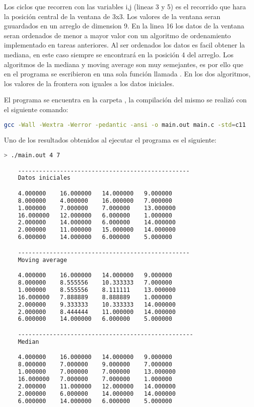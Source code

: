 Los ciclos que recorren con las variables i,j (lineas 3 y 5) es el recorrido que hara la posición central de la ventana de 3x3. Los valores de la ventana seran guuardados en un arreglo de dimension 9. En la linea 16 los datos de la ventana seran ordenados de menor a mayor valor con un algoritmo de ordenamiento implementado en tareas anteriores. Al ser ordenados los datos es facil obtener la mediana, en este caso siempre se encontrará en la posición 4 del arreglo. Los algoritmos de la mediana y moving average son muy semejantes, es por ello que en el programa  se escribieron en una sola función llamada . En los dos algoritmos, los valores de la frontera son iguales a los datos iniciales.

El programa se encuentra en la carpeta , la compilación del mismo se realizó con el siguiente comando:

\begin{lstlisting}[language=bash]
    gcc -Wall -Wextra -Werror -pedantic -ansi -o main.out main.c -std=c11
\end{lstlisting}

Uno de los resultados obtenidos al ejecutar el programa es el siguiente:

\begin{lstlisting}[language=bash]
    > ./main.out 4 7

    -------------------------------------------------
    Datos iniciales

    4.000000	16.000000	14.000000	9.000000	
    8.000000	4.000000	16.000000	7.000000	
    1.000000	7.000000	7.000000	13.000000	
    16.000000	12.000000	6.000000	1.000000	
    2.000000	14.000000	6.000000	14.000000	
    2.000000	11.000000	15.000000	14.000000	
    6.000000	14.000000	6.000000	5.000000	

    -------------------------------------------------
    Moving average

    4.000000	16.000000	14.000000	9.000000	
    8.000000	8.555556	10.333333	7.000000	
    1.000000	8.555556	8.111111	13.000000	
    16.000000	7.888889	8.888889	1.000000	
    2.000000	9.333333	10.333333	14.000000	
    2.000000	8.444444	11.000000	14.000000	
    6.000000	14.000000	6.000000	5.000000	

    --------------------------------------------------
    Median

    4.000000	16.000000	14.000000	9.000000	
    8.000000	7.000000	9.000000	7.000000	
    1.000000	7.000000	7.000000	13.000000	
    16.000000	7.000000	7.000000	1.000000	
    2.000000	11.000000	12.000000	14.000000	
    2.000000	6.000000	14.000000	14.000000	
    6.000000	14.000000	6.000000	5.000000
\end{lstlisting}